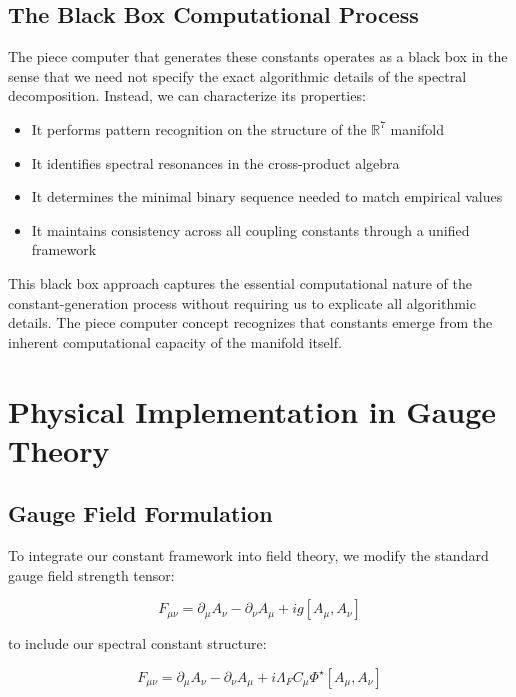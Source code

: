 \documentclass{article}
\begin{document}
\subsection{The Black Box Computational Process}

The piece computer that generates these constants operates as a black box in the sense that we need not specify the exact algorithmic details of the spectral decomposition. Instead, we can characterize its properties:

\begin{itemize}
\item It performs pattern recognition on the structure of the $\mathbb{R}^7$ manifold
\item It identifies spectral resonances in the cross-product algebra
\item It determines the minimal binary sequence needed to match empirical values
\item It maintains consistency across all coupling constants through a unified framework
\end{itemize}

This black box approach captures the essential computational nature of the constant-generation process without requiring us to explicate all algorithmic details. The piece computer concept recognizes that constants emerge from the inherent computational capacity of the manifold itself.

\section{Physical Implementation in Gauge Theory}

\subsection{Gauge Field Formulation}

To integrate our constant framework into field theory, we modify the standard gauge field strength tensor:

\begin{equation}
F_{\mu\nu} = \partial_\mu A_\nu - \partial_\nu A_\mu + ig[A_\mu, A_\nu]
\end{equation}

to include our spectral constant structure:

\begin{equation}
F_{\mu\nu} = \partial_\mu A_\nu - \partial_\nu A_\mu + i\Lambda_F C_\mu \Phi^\star [A_\mu, A_\nu]
\end{equation}
\end{document}
